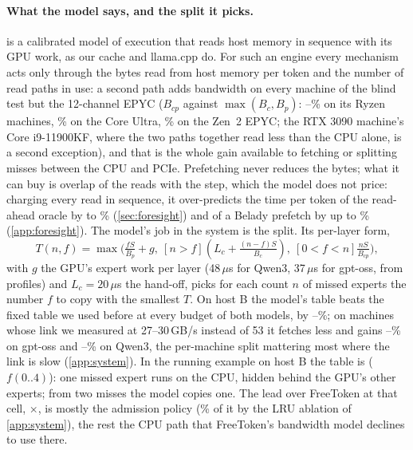 

\paragraph{What the model says, and the split it picks.}  is a calibrated model of execution that reads host
memory in sequence with its GPU work, as our cache and llama.cpp do. For such an engine every mechanism acts only
through the bytes read from host memory per token and the number of read paths in use: a second path adds bandwidth on
every machine of the blind test but the 12-channel EPYC ($B_{cp}$ against $\max(B_c,B_p)$: \secondMin--\secondMax\%
on its Ryzen machines, \secondUltra\% on the Core Ultra, \secondEpyc\% on the Zen~2 EPYC; the RTX 3090 machine's Core
i9-11900KF, where the two paths together read less than the CPU alone, is a second exception), and that is the whole
gain available to fetching or splitting misses between the CPU and PCIe. Prefetching never reduces the bytes; what
it can buy is overlap of the reads with the step, which the model does not price: charging every read in sequence, it
over-predicts the time per token of the read-ahead oracle by \fxPacedLawTimeMin{} to \fxPacedLawTimeMax\% (\cref{sec:foresight})
and of a Belady prefetch by up to \fspLawErrHighMax\% (\cref{app:foresight}). The model's job in the system is the split.
Its
per-layer form,
\begin{equation}
T(n,f)=\max\!\big(\tfrac{fS}{B_p}+g,\ [n{>}f](L_c+\tfrac{(n-f)S}{B_c}),\ [0{<}f{<}n]\tfrac{nS}{B_{cp}}\big),
\label{eq:split}
\end{equation}
with $g$ the GPU's expert work per layer (48\,$\mu$s for Qwen3, 37\,$\mu$s for gpt-oss, from profiles) and
$L_c{=}20\,\mu$s the hand-off, picks for each count $n$ of missed experts the number $f$ to copy with the smallest
$T$. On host B the model's table beats the fixed table we used before at every budget of both models, by
\lawGainMin--\lawGainMax\%; on machines whose link we measured at 27--30\,GB/s instead of 53 it fetches less and gains
\hpGptLawMin--\hpGptLawMax\% on gpt-oss and \hpQwenLawMin--\hpQwenLawMax\% on Qwen3, the per-machine split mattering
most where the link is slow (\cref{app:system}). In the running example on host B the table is
\texttt{\scTableGptB} ($f(0..4)$): one missed expert runs on the CPU, hidden behind the GPU's other experts; from two
misses the model copies one. The lead over FreeToken at that cell, \ftRatioGptMid$\times$, is mostly the admission
policy (\scPolicyShareGptMin\% of it by the LRU ablation of \cref{app:system}), the rest the CPU path that FreeToken's
bandwidth model declines to use there.

